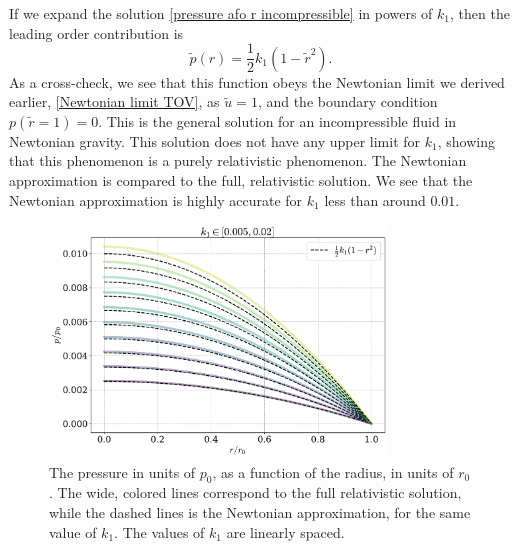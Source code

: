  
If we expand the solution \autoref{pressure afo r incompressible} in powers of $k_1$, then the leading order contribution is
%
\begin{equation}
    \tilde p(r) = \frac{1}{2} k_1 (1 - \tilde r^2).
\end{equation}
%
As a cross-check, we see that this function obeys the Newtonian limit we derived earlier, \autoref{Newtonian limit TOV}, as $\tilde u = 1$, and the boundary condition $p(\tilde r = 1) = 0$.
This is the general solution for an incompressible fluid in Newtonian gravity.
This solution does not have any upper limit for $k_1$, showing that this phenomenon is a purely relativistic phenomenon.
The Newtonian approximation is compared to the full, relativistic solution.
We see that the Newtonian approximation is highly accurate for $k_1$ less than around $0.01$.


\begin{figure}[h]
    \centering
    \includegraphics[width=0.8\textwidth]{../scripts/figurer/incompressible_newt.pdf}
    \caption{The pressure in units of $p_0$, as a function of the radius, in units of $r_0$. The wide, colored lines correspond to the full relativistic solution, while the dashed lines is the Newtonian approximation, for the same value of $k_1$. The values of $k_1$ are linearly spaced.  }
    \label{fig: pressure incompressible fluid newtonian}
\end{figure}


